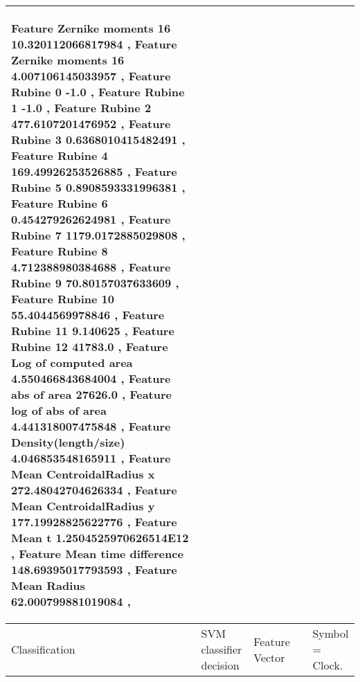\begin{landscape}
\begin{scriptsize}
\begin{longtable}{|p{2cm}|p{2cm}|p{2cm}|p{2cm}|p{13cm}|}
\begin{scriptsize}
Feature Zernike moments 16 10.320112066817984   ,    Feature Zernike moments 16 4.007106145033957   ,    Feature Rubine 0 -1.0   ,    Feature Rubine 1 -1.0   ,    Feature Rubine 2 477.6107201476952   ,    Feature Rubine 3 0.6368010415482491   ,    Feature Rubine 4 169.49926253526885   ,    Feature Rubine 5 0.8908593331996381   ,    Feature Rubine 6 0.454279262624981   ,    Feature Rubine 7 1179.0172885029808   ,    Feature Rubine 8 4.712388980384688   ,    Feature Rubine 9 70.80157037633609   ,    Feature Rubine 10 55.4044569978846   ,    Feature Rubine 11 9.140625   ,    Feature Rubine 12 41783.0   ,    Feature  Log of computed area 4.550466843684004   ,    Feature  abs of area 27626.0   ,    Feature log of  abs of area 4.441318007475848   ,    Feature  Density(length/size)  4.046853548165911   ,    Feature Mean CentroidalRadius x 272.48042704626334   ,    Feature Mean CentroidalRadius y 177.19928825622776   ,    Feature Mean t 1.2504525970626514E12   ,    Feature Mean time difference 148.69395017793593   ,    Feature Mean Radius 62.000799881019084   ,  
   \end{scriptsize} \\ \hline
   Classification  & SVM classifier decision & Feature Vector  &  & 
   Symbol = Clock.  
 
 \\ \hline
   
 		\end{longtable}


\end{scriptsize}

\end{landscape}
